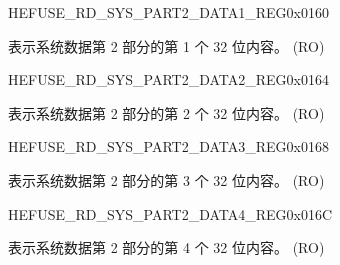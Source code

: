 \begin{register}{H}{EFUSE\_RD\_SYS\_PART2\_DATA1\_REG}{0x0160}\label{regdesc:EFUSERDSYSPART2DATA1REG}
%
\regnewline%
\begin{regdesc}\begin{reglist}
\label{fielddesc:EFUSESYSDATAPART21}\item [EFUSE\_SYS\_DATA\_PART2\_1] 表示系统数据第 2 部分的第 1 个 32 位内容。 (RO)
\end{reglist}\end{regdesc}
\end{register}


\begin{register}{H}{EFUSE\_RD\_SYS\_PART2\_DATA2\_REG}{0x0164}\label{regdesc:EFUSERDSYSPART2DATA2REG}
%
\regnewline%
\begin{regdesc}\begin{reglist}
\label{fielddesc:EFUSESYSDATAPART22}\item [EFUSE\_SYS\_DATA\_PART2\_2] 表示系统数据第 2 部分的第 2 个 32 位内容。 (RO)
\end{reglist}\end{regdesc}
\end{register}


\begin{register}{H}{EFUSE\_RD\_SYS\_PART2\_DATA3\_REG}{0x0168}\label{regdesc:EFUSERDSYSPART2DATA3REG}
%
\regnewline%
\begin{regdesc}\begin{reglist}
\label{fielddesc:EFUSESYSDATAPART23}\item [EFUSE\_SYS\_DATA\_PART2\_3] 表示系统数据第 2 部分的第 3 个 32 位内容。 (RO)
\end{reglist}\end{regdesc}
\end{register}


\begin{register}{H}{EFUSE\_RD\_SYS\_PART2\_DATA4\_REG}{0x016C}\label{regdesc:EFUSERDSYSPART2DATA4REG}
%
\regnewline%
\begin{regdesc}\begin{reglist}
\label{fielddesc:EFUSESYSDATAPART24}\item [EFUSE\_SYS\_DATA\_PART2\_4] 表示系统数据第 2 部分的第 4 个 32 位内容。 (RO)
\end{reglist}\end{regdesc}
\end{register}


